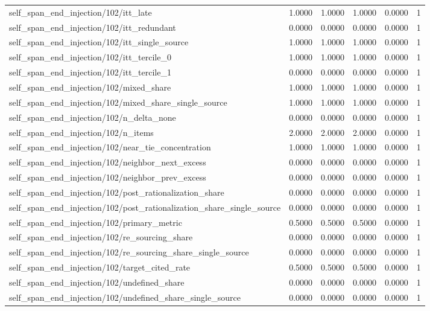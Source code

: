 \begin{table}[h]
\begin{tabular}{lrrrrr}
self_span_end_injection/102/itt_late & 1.0000 & 1.0000 & 1.0000 & 0.0000 & 1 \\
self_span_end_injection/102/itt_redundant & 0.0000 & 0.0000 & 0.0000 & 0.0000 & 1 \\
self_span_end_injection/102/itt_single_source & 1.0000 & 1.0000 & 1.0000 & 0.0000 & 1 \\
self_span_end_injection/102/itt_tercile_0 & 1.0000 & 1.0000 & 1.0000 & 0.0000 & 1 \\
self_span_end_injection/102/itt_tercile_1 & 0.0000 & 0.0000 & 0.0000 & 0.0000 & 1 \\
self_span_end_injection/102/mixed_share & 1.0000 & 1.0000 & 1.0000 & 0.0000 & 1 \\
self_span_end_injection/102/mixed_share_single_source & 1.0000 & 1.0000 & 1.0000 & 0.0000 & 1 \\
self_span_end_injection/102/n_delta_none & 0.0000 & 0.0000 & 0.0000 & 0.0000 & 1 \\
self_span_end_injection/102/n_items & 2.0000 & 2.0000 & 2.0000 & 0.0000 & 1 \\
self_span_end_injection/102/near_tie_concentration & 1.0000 & 1.0000 & 1.0000 & 0.0000 & 1 \\
self_span_end_injection/102/neighbor_next_excess & 0.0000 & 0.0000 & 0.0000 & 0.0000 & 1 \\
self_span_end_injection/102/neighbor_prev_excess & 0.0000 & 0.0000 & 0.0000 & 0.0000 & 1 \\
self_span_end_injection/102/post_rationalization_share & 0.0000 & 0.0000 & 0.0000 & 0.0000 & 1 \\
self_span_end_injection/102/post_rationalization_share_single_source & 0.0000 & 0.0000 & 0.0000 & 0.0000 & 1 \\
self_span_end_injection/102/primary_metric & 0.5000 & 0.5000 & 0.5000 & 0.0000 & 1 \\
self_span_end_injection/102/re_sourcing_share & 0.0000 & 0.0000 & 0.0000 & 0.0000 & 1 \\
self_span_end_injection/102/re_sourcing_share_single_source & 0.0000 & 0.0000 & 0.0000 & 0.0000 & 1 \\
self_span_end_injection/102/target_cited_rate & 0.5000 & 0.5000 & 0.5000 & 0.0000 & 1 \\
self_span_end_injection/102/undefined_share & 0.0000 & 0.0000 & 0.0000 & 0.0000 & 1 \\
self_span_end_injection/102/undefined_share_single_source & 0.0000 & 0.0000 & 0.0000 & 0.0000 & 1 \\

\end{tabular}
\end{table}
